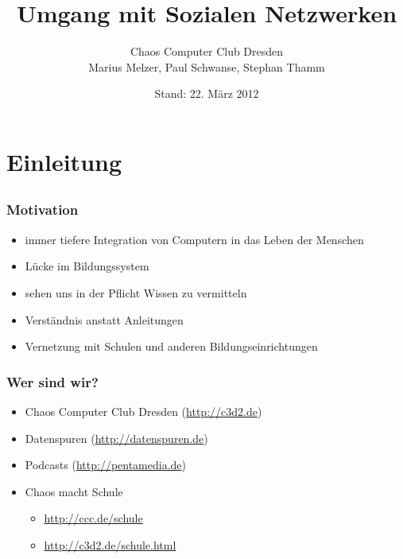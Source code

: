 \documentclass[14pt,handout]{beamer}
\title{Umgang mit Sozialen Netzwerken}
\author{Chaos Computer Club Dresden\\Marius Melzer, Paul Schwanse, Stephan Thamm}
\date{Stand: 22. März 2012}
\begin{document}
\maketitle

\frame{\tableofcontents[hideallsubsections]}

\section{Einleitung}
\subsection{}

\begin{frame}
  \frametitle{Motivation}
  \begin{itemize}
    \item<2-> immer tiefere Integration von Computern in das Leben der Menschen
    \item<3-> Lücke im Bildungssystem
    \item<4-> sehen uns in der Pflicht Wissen zu vermitteln
    \item<5-> Verständnis anstatt Anleitungen
    \item<6-> Vernetzung mit Schulen und anderen Bildungseinrichtungen
  \end{itemize}
\end{frame}

\begin{frame}
  \frametitle{Wer sind wir?}
  \begin{itemize}
    \item<2-> Chaos Computer Club Dresden (\url{http://c3d2.de})
      \note{}
    \item<3-> Datenspuren (\url{http://datenspuren.de})
    \item<4-> Podcasts (\url{http://pentamedia.de})
    \item<5-> Chaos macht Schule
      \begin{itemize}
        \item \url{http://ccc.de/schule}
        \item \url{http://c3d2.de/schule.html}
      \end{itemize}
  \end{itemize}
\end{frame}
\end{document}
